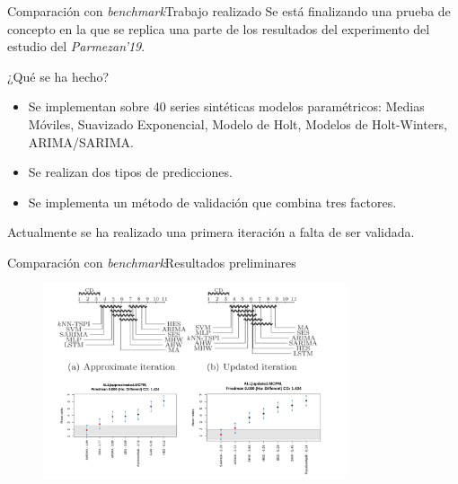 \documentclass[12pt, aspectratio=169]{beamer} %
\begin{document}
\begin{frame}{Comparación con \textit{benchmark}}{Trabajo realizado}
  Se está finalizando una prueba de concepto en la que se replica una parte de los resultados del experimento del estudio del \textit{Parmezan'19}.
  \begin{block}{¿Qué se ha hecho?}
    \begin{itemize}
    \item Se implementan sobre 40 series sintéticas modelos paramétricos: Medias Móviles, Suavizado Exponencial, Modelo de Holt, Modelos de Holt-Winters, ARIMA/SARIMA. 
    \item Se realizan dos tipos de predicciones.
    \item Se implementa un método de validación que combina tres factores.
    \end{itemize}
  \end{block}
  Actualmente se ha realizado una primera iteración a falta de ser validada.

\end{frame}

\begin{frame}{Comparación con \textit{benchmark}}{Resultados preliminares}
  \begin{figure}
    \includegraphics[width=0.8\textwidth]{20210413_2_resultados.png}
    \label{fig:resultados}
  \end{figure}
\end{frame}
\end{document}
